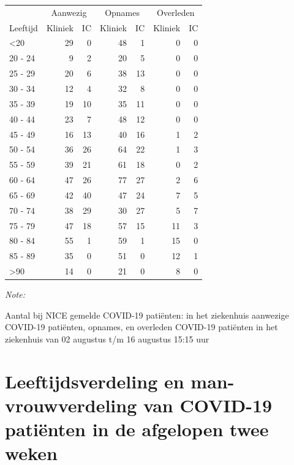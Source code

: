 \documentclass[
  english,
  man,floatsintext]{apa6}
\begin{document}
\begin{table}
\centering\begingroup\fontsize{10}{12}\selectfont

\begin{threeparttable}
\begin{tabular}{lrrrrrr}
\toprule
\multicolumn{1}{c}{ } & \multicolumn{2}{c}{Aanwezig} & \multicolumn{2}{c}{Opnames} & \multicolumn{2}{c}{Overleden} \\
\cmidrule(l{3pt}r{3pt}){2-3} \cmidrule(l{3pt}r{3pt}){4-5} \cmidrule(l{3pt}r{3pt}){6-7}
Leeftijd & Kliniek & IC & Kliniek & IC & Kliniek & IC\\
\midrule
<20 & 29 & 0 & 48 & 1 & 0 & 0\\
20 - 24 & 9 & 2 & 20 & 5 & 0 & 0\\
25 - 29 & 20 & 6 & 38 & 13 & 0 & 0\\
30 - 34 & 12 & 4 & 32 & 8 & 0 & 0\\
35 - 39 & 19 & 10 & 35 & 11 & 0 & 0\\
40 - 44 & 23 & 7 & 48 & 12 & 0 & 0\\
45 - 49 & 16 & 13 & 40 & 16 & 1 & 2\\
50 - 54 & 36 & 26 & 64 & 22 & 1 & 3\\
55 - 59 & 39 & 21 & 61 & 18 & 0 & 2\\
60 - 64 & 47 & 26 & 77 & 27 & 2 & 6\\
65 - 69 & 42 & 40 & 47 & 24 & 7 & 5\\
70 - 74 & 38 & 29 & 30 & 27 & 5 & 7\\
75 - 79 & 47 & 18 & 57 & 15 & 11 & 3\\
80 - 84 & 55 & 1 & 59 & 1 & 15 & 0\\
85 - 89 & 35 & 0 & 51 & 0 & 12 & 1\\
>90 & 14 & 0 & 21 & 0 & 8 & 0\\
\bottomrule
\end{tabular}
\begin{tablenotes}
\item \textit{Note: } 
\item Aantal bij NICE gemelde COVID-19 patiënten: in het ziekenhuis aanwezige COVID-19 patiënten, opnames, en overleden COVID-19 patiënten in het ziekenhuis van 02 augustus t/m 16 augustus 15:15 uur
\end{tablenotes}
\end{threeparttable}
\endgroup{}
\end{table}

\newpage

\hypertarget{leeftijdsverdeling-en-man-vrouwverdeling-van-covid-19-patiuxebnten-in-de-afgelopen-twee-weken}{%
\section{Leeftijdsverdeling en man-vrouwverdeling van COVID-19 patiënten in de afgelopen twee weken}\label{leeftijdsverdeling-en-man-vrouwverdeling-van-covid-19-patiuxebnten-in-de-afgelopen-twee-weken}}
\end{document}
